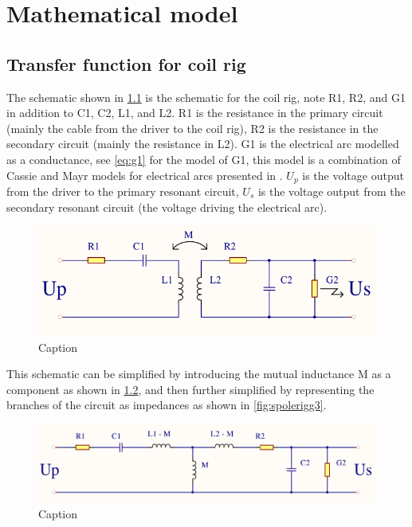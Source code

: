 \chapter{Mathematical model}

\section{Transfer function for coil rig}

The schematic shown in \cref{fig:spolerigg1} is the schematic for the coil rig, note R1, R2, and G1 in addition to C1, C2, L1, and L2. R1 is the resistance in the primary circuit (mainly the cable from the driver to the coil rig), R2 is the resistance in the secondary circuit (mainly the resistance in L2). G1 is the electrical arc modelled as a conductance, see \cref{eq:g1} for the model of G1, this model is a combination of Cassie \citep{cassie} and Mayr \citep{mayr} models for electrical arcs presented in \citep{575670}. $U_p$ is the voltage output from the driver to the primary resonant circuit, $U_s$ is the voltage output from the secondary resonant circuit (the voltage driving the electrical arc).

\begin{figure}[h!]
    \centering
    \includegraphics[width=\textwidth]{Skjema/Spolerigg1.pdf}
    \caption{Caption}
    \label{fig:spolerigg1}
\end{figure}

This schematic can be simplified by introducing the mutual inductance M as a component as shown in \cref{fig:spolerigg2}, and then further simplified by representing the branches of the circuit as impedances as shown in \cref{fig:spolerigg3}.

\begin{figure}[h!]
    \centering
    \includegraphics[width=\textwidth]{Skjema/Spolerigg2.pdf}
    \caption{Caption}
    \label{fig:spolerigg2}
\end{figure}

